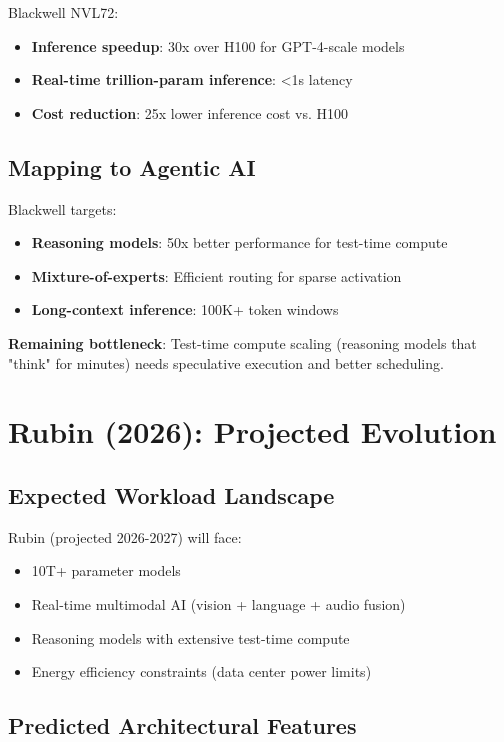\documentclass{article}
\begin{document}
Blackwell NVL72:
\begin{itemize}
\item \textbf{Inference speedup}: 30x over H100 for GPT-4-scale models
\item \textbf{Real-time trillion-param inference}: <1s latency
\item \textbf{Cost reduction}: 25x lower inference cost vs. H100
\end{itemize}

\subsection{Mapping to Agentic AI}

Blackwell targets:
\begin{itemize}
\item \textbf{Reasoning models}: 50x better performance for test-time compute
\item \textbf{Mixture-of-experts}: Efficient routing for sparse activation
\item \textbf{Long-context inference}: 100K+ token windows
\end{itemize}

\textbf{Remaining bottleneck}: Test-time compute scaling (reasoning models that "think" for minutes) needs speculative execution and better scheduling.

\section{Rubin (2026): Projected Evolution}

\subsection{Expected Workload Landscape}

Rubin (projected 2026-2027) will face:
\begin{itemize}
\item 10T+ parameter models
\item Real-time multimodal AI (vision + language + audio fusion)
\item Reasoning models with extensive test-time compute
\item Energy efficiency constraints (data center power limits)
\end{itemize}

\subsection{Predicted Architectural Features}
\end{document}
